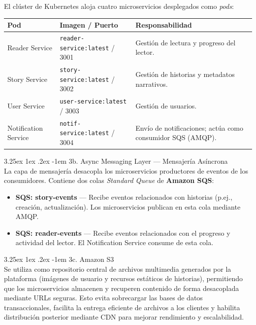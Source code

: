 \documentclass[a4paper,11 pt]{article}
\makeatletter
\renewcommand\paragraph{\@startsection{paragraph}{5}{\z@}%
  {3.25ex \@plus1ex \@minus.2ex}%
  {-1em}%
  {\normalfont\normalsize\bfseries}}
\makeatother
\begin{document}
El clúster de Kubernetes aloja cuatro microservicios desplegados como \textit{pods}:

\begin{table}[H]
\centering
\footnotesize
\begin{tabular}{|M{0.2\textwidth}|M{0.3\textwidth}|M{0.3\textwidth}|}
 \hline
    \textbf{Pod} & \textbf{Imagen / Puerto} & \textbf{Responsabilidad} \\
    \hline
    Reader Service & \texttt{reader-service:latest} / 3001 & Gestión de lectura y progreso del lector. \\
     \hline
     Story Service & \texttt{story-service:latest} / 3002 & Gestión de historias y metadatos narrativos. \\
     \hline
    User Service & \texttt{user-service:latest} / 3003 & Gestión de usuarios. \\
     \hline
    Notification Service & \texttt{notif-service:latest} / 3004 & Envío de notificaciones; actúa como consumidor SQS (AMQP). \\
     \hline
\end{tabular}
\end{table}


\paragraph{3b. Async Messaging Layer — Mensajería Asíncrona}\mbox{}\\

La capa de mensajería desacopla los microservicios productores de eventos de los consumidores. Contiene dos colas \textit{Standard Queue} de \textbf{Amazon SQS}:

\begin{itemize}
    \item \textbf{SQS: story-events} — Recibe eventos relacionados con historias (p.ej., creación, actualización). Los microservicios publican en esta cola mediante AMQP.
    \item \textbf{SQS: reader-events} — Recibe eventos relacionados con el progreso y actividad del lector. El Notification Service consume de esta cola.
\end{itemize}


\paragraph{3c. Amazon S3}\mbox{}\\

Se utiliza como repositorio central de archivos multimedia generados por la plataforma (imágenes de usuario y recursos estáticos de historias), permitiendo que los microservicios almacenen y recuperen contenido de forma desacoplada mediante URLs seguras. Esto evita sobrecargar las bases de datos transaccionales, facilita la entrega eficiente de archivos a los clientes y habilita distribución posterior mediante CDN para mejorar rendimiento y escalabilidad.
\end{document}
